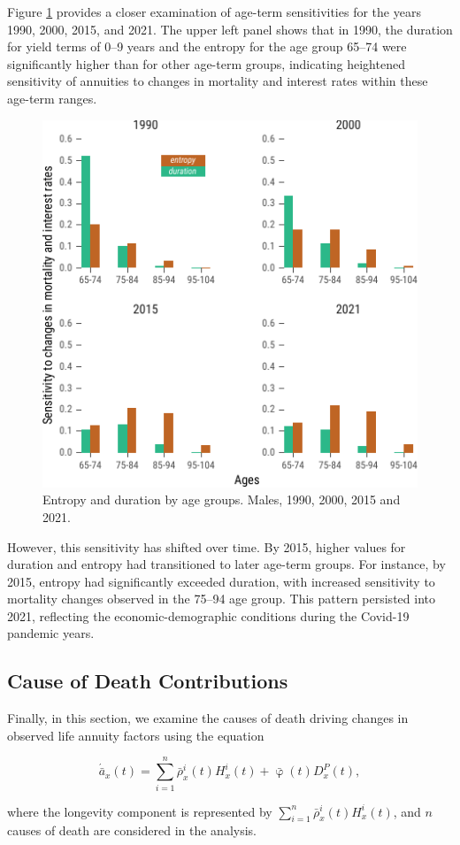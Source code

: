 \documentclass[12pt]{article}
\begin{document}
{Figure \ref{fig:Fig6} provides a closer examination of age-term sensitivities for the years 1990, 2000, 2015, and 2021. The upper left panel shows that in 1990, the duration for yield terms of 0–9 years and the entropy for the age group 65–74 were significantly higher than for other age-term groups, indicating heightened sensitivity of annuities to changes in mortality and interest rates within these age-term ranges. 

\begin{figure}[H]
	\centering
	\includegraphics[width=0.6\linewidth]{Fig/attributionEntropyDuration}
	\caption{{Entropy and duration by age groups. Males, 1990, 2000, 2015 and 2021.}}
	\label{fig:Fig6}
\end{figure}


However, this sensitivity has shifted over time. By 2015, higher values for duration and entropy had transitioned to later age-term groups. For instance, by 2015, entropy had significantly exceeded duration, with increased sensitivity to mortality changes observed in the 75–94 age group. This pattern persisted into 2021, reflecting the economic-demographic conditions during the Covid-19 pandemic years.

\subsection{Cause of Death Contributions}

Finally, in this section, we examine the causes of death driving changes in observed life annuity factors using the equation 

\[
\acute{\bar{a}}_x(t) = \sum_{i=1}^{n} \bar{\rho}^i_x(t) {H}^i_x(t) + \bar{\upvarphi}(t) {D}^P_x(t),
\]

where the longevity component is represented by \( \sum_{i=1}^{n} \bar{\rho}^i_x(t) {H}^i_x(t) \), and \( n \) causes of death are considered in the analysis.

}
\end{document}
